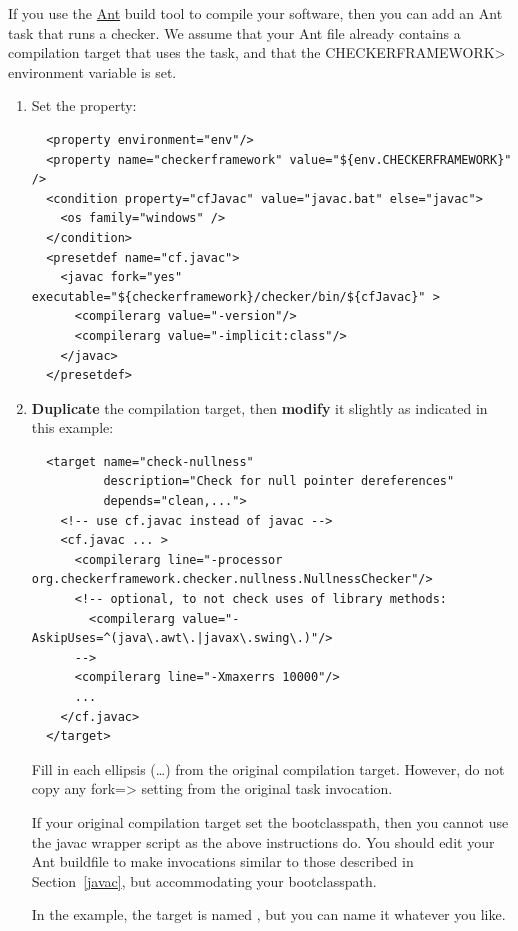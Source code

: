 
If you use the \href{https://ant.apache.org/}{Ant} build tool to compile
your software, then you can add an Ant task that runs a checker.  We assume
that your Ant file already contains a compilation target that uses the
 task, and that the \<CHECKERFRAMEWORK> environment variable is set.

\begin{enumerate}
\item
Set the  property:

\begin{smaller}
\begin{Verbatim}
  <property environment="env"/>
  <property name="checkerframework" value="${env.CHECKERFRAMEWORK}" />
  <condition property="cfJavac" value="javac.bat" else="javac">
    <os family="windows" />
  </condition>
  <presetdef name="cf.javac">
    <javac fork="yes" executable="${checkerframework}/checker/bin/${cfJavac}" >
      <compilerarg value="-version"/>
      <compilerarg value="-implicit:class"/>
    </javac>
  </presetdef>
\end{Verbatim}
\end{smaller}

\item \textbf{Duplicate} the compilation target, then \textbf{modify} it slightly as
indicated in this example:

\begin{smaller}
\begin{Verbatim}
  <target name="check-nullness"
          description="Check for null pointer dereferences"
          depends="clean,...">
    <!-- use cf.javac instead of javac -->
    <cf.javac ... >
      <compilerarg line="-processor org.checkerframework.checker.nullness.NullnessChecker"/>
      <!-- optional, to not check uses of library methods:
        <compilerarg value="-AskipUses=^(java\.awt\.|javax\.swing\.)"/>
      -->
      <compilerarg line="-Xmaxerrs 10000"/>
      ...
    </cf.javac>
  </target>
\end{Verbatim}
\end{smaller}

Fill in each ellipsis (\ldots) from the original compilation target.
However, do not copy any \<fork=> setting from the original 
task invocation.

If your original compilation target set the bootclasspath, then you cannot
use the javac wrapper script as the above instructions do.  You should edit
your Ant buildfile to make invocations similar to those described in
Section~\ref{javac}, but accommodating your bootclasspath.

In the example, the target is named , but you can
name it whatever you like.
\end{enumerate}

